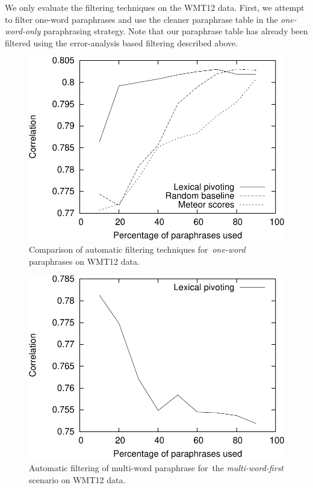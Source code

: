 \documentclass[11pt]{article}
\begin{document}
We only evaluate the filtering techniques on the WMT12 data. First, we attempt
to filter one-word paraphrases and use the cleaner paraphrase table in the
\emph{one-word-only} paraphrasing strategy. Note that our paraphrase table has
already been filtered using the error-analysis based filtering described above.

\begin{figure}[ht]
\begin{center}
\includegraphics[scale=0.55]{filtering-lexical-cropped.pdf}
\caption{Comparison of automatic filtering techniques for~\emph{one-word} paraphrases on WMT12 data.}
\label{fig:filtering-lexical}
\end{center}
\end{figure}

\begin{figure}[ht]
\begin{center}
\includegraphics[scale=0.55]{filtering-mwe-cropped.pdf}
\caption{Automatic filtering of multi-word paraphrase for~the \textit{multi-word-first} scenario on WMT12 data.}
\label{fig:filtering-mwe}
\end{center}
\end{figure}
\end{document}
